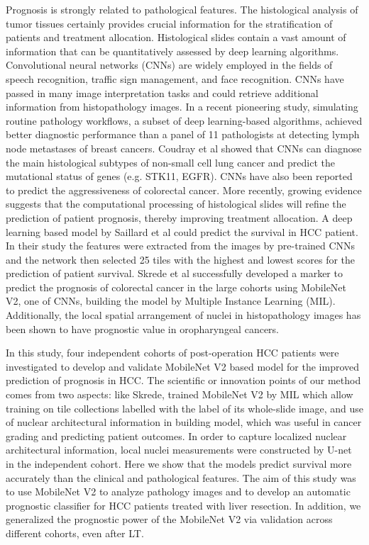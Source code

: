 \documentclass{article}
\begin{document}
Prognosis is strongly related to pathological features. The histological analysis of tumor tissues certainly provides crucial information for the stratification of patients and treatment allocation. Histological slides contain a vast amount of information that can be quantitatively assessed by deep learning algorithms. Convolutional neural networks (CNNs) are widely employed in the fields of speech recognition, traffic sign management, and face recognition\cite{sainath2015deep}\cite{shao2018real}\cite{guo2020multi}. CNNs have passed in many image interpretation tasks and could retrieve additional information from histopathology images. In a recent pioneering study, simulating routine pathology workflows, a subset of deep learning-based algorithms, achieved better diagnostic performance than a panel of 11 pathologists at detecting lymph node metastases of breast cancers\cite{bejnordi2017diagnostic}. Coudray et al showed that CNNs can diagnose the main histological subtypes of non-small cell lung cancer and predict the mutational status of genes (e.g. STK11, EGFR)\cite{coudray2018classification}. CNNs have also been reported to predict the aggressiveness of colorectal cancer\cite{kather2019predicting}. More recently, growing evidence suggests that the computational processing of histological slides will refine the prediction of patient prognosis, thereby improving treatment allocation. A deep learning based model by Saillard et al could predict the survival in HCC patient. In their study the features were extracted from the images by pre-trained CNNs and the network then selected 25 tiles with the highest and lowest scores for the prediction of patient survival\cite{saillard2020predicting}. Skrede et al successfully developed a marker to predict the prognosis of colorectal cancer in the large cohorts using MobileNet V2, one of CNNs\cite{skrede2020deep}, building the model by Multiple Instance Learning (MIL). Additionally, the local spatial arrangement of nuclei in histopathology images has been shown to have prognostic value in oropharyngeal cancers\cite{lu2021feature}.

In this study, four independent cohorts of post-operation HCC patients were investigated to develop and validate MobileNet V2 based model for the improved prediction of prognosis in HCC. The scientific or innovation points of our method comes from two aspects: like Skrede, trained MobileNet V2 by MIL which allow training on tile collections labelled with the label of its whole-slide image\cite{skrede2020deep}, and use of nuclear architectural information in building model, which was useful in cancer grading and predicting patient outcomes\cite{ji2019nuclear}. In order to capture localized nuclear architectural information, local nuclei measurements were constructed by U-net in the independent cohort. Here we show that the models predict survival more accurately than the clinical and pathological features. The aim of this study was to use MobileNet V2 to analyze pathology images and to develop an automatic prognostic classifier for HCC patients treated with liver resection. In addition, we generalized the prognostic power of the MobileNet V2 via validation across different cohorts, even after LT.
\end{document}
